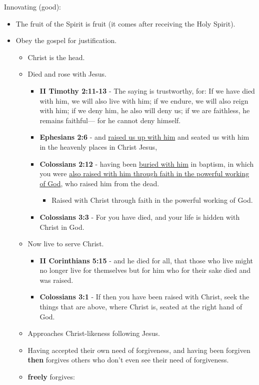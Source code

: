 \documentclass[11pt]{article}
\begin{document}
Innovating (good):
\begin{itemize}
\item The fruit of the Spirit is fruit (it comes after receiving the Holy Spirit).
\item Obey the gospel for justification.
\begin{itemize}
\item Christ is the head.
\item Died and rose with Jesus.
\begin{itemize}
\item \textbf{II Timothy 2:11-13} - The saying is trustworthy, for: If we have died with him, we will also live with him; if we endure, we will also reign with him; if we deny him, he also will deny us; if we are faithless, he remains faithful— for he cannot deny himself.
\item \textbf{Ephesians 2:6} - and \uline{raised us up with him} and seated us with him in the heavenly places in Christ Jesus,
\item \textbf{Colossians 2:12} - having been \uline{buried with him} in baptism, in which you were \uline{also raised with him through faith in the powerful working of God}, who raised him from the dead.
\begin{itemize}
\item Raised with Christ through faith in the powerful working of God.
\end{itemize}
\item \textbf{Colossians 3:3} - For you have died, and your life is hidden with Christ in God.
\end{itemize}
\item Now live to serve Christ.
\begin{itemize}
\item \textbf{II Corinthians 5:15} - and he died for all, that those who live might no longer live for themselves but for him who for their sake died and was raised.
\item \textbf{Colossians 3:1} - If then you have been raised with Christ, seek the things that are above, where Christ is, seated at the right hand of God.
\end{itemize}
\item Approaches Christ-likeness following Jesus.
\item Having accepted their own need of forgiveness, and having been forgiven \textbf{then} forgives others who don't even see their need of forgiveness.
\item \textbf{freely} forgives:

\end{itemize}
\end{itemize}
\end{document}
